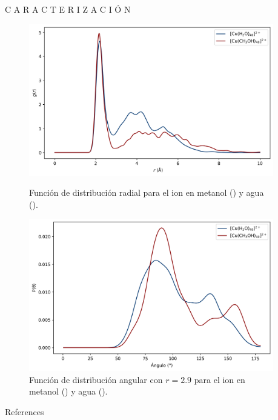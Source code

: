 \documentclass[final]{beamer}
\newlength{\sepwidth}
\newlength{\colwidth}
\newcommand{\separatorcolumn}{\begin{column}{\sepwidth}\end{column}}
\begin{document}
\begin{frame}[t]
\begin{columns}[t]
\begin{column}{\colwidth}
\begin{block}{C A R A C T E R I Z A C I Ó N }{}
				\begin{figure}[H]
					\centering
					\begin{minipage}[c]{0.49\textwidth} %
						\centering
						\includegraphics[width=\textwidth]{logos/RDF-OUTPUT-HISTOGRAMA.png}
						\caption{Función de distribución radial para el ion  en metanol () y agua ().}
						\label{fig:rdfcu40ch4o}
					\end{minipage}%
					\hfill %
					\begin{minipage}[c]{0.49\textwidth} %
						\centering
						\includegraphics[width=\textwidth]{logos/ADF-OUTPUT-HISTOGRAMA.png}
						\caption{Función de distribución angular con $r = 2.9$ para el ion  en metanol () y agua ().}
						\label{fig:adfcu40ch4o}
					\end{minipage}
				\end{figure}

			\end{block}	

			\begin{block}{References}
				\printbibliography[heading=none]
			\end{block}
		\end{column}
		
		\separatorcolumn
	\end{columns}
\end{frame}
\end{document}
